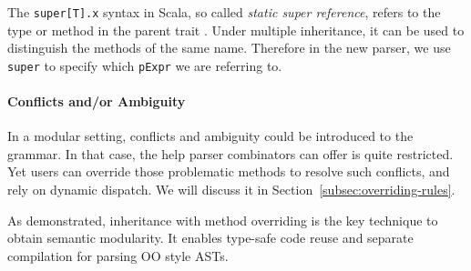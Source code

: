 The \lstinline{super[T].x} syntax in Scala, so called \textit{static super reference}, refers to the type or method
 in the parent trait . Under multiple inheritance, it can be used to distinguish
the methods of the same name. Therefore in the new parser, we use \lstinline{super} to specify which
\lstinline{pExpr} we are referring to.



\begin{comment}
\bruno{You can present the abstract example, as you do
  here, but you should also present a concrete example. You
already have Var, maybe you can add another language extension for
boolean literals. Show the code for the boolean literals parsing as
well as the composition code.}

Interestingly note that, due to the use of multiple inheritance, we
need two different super calls.\bruno{expand here. People may not
be familiar with scala super calls, you have to explain what the
syntax does.}
\end{comment}


\vspace{-.05in}
\paragraph{Conflicts and/or Ambiguity} In a modular setting, conflicts and
ambiguity could be introduced to the grammar. In that case, the help parser combinators
can offer is quite restricted. Yet users can override those problematic methods to resolve
such conflicts, and rely on dynamic dispatch. We will discuss it in Section~\ref{subsec:overriding-rules}.

As demonstrated, inheritance with method overriding is the key
technique to obtain semantic modularity.  It enables type-safe code
reuse and separate compilation for parsing OO style ASTs.
